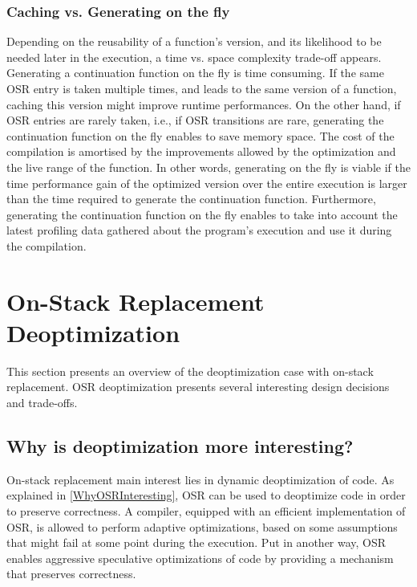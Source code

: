 \subsubsection{Caching vs. Generating on the fly}

Depending on the reusability of a function's version, and its likelihood to be needed later in the execution, a time vs. space complexity trade-off appears.
Generating a continuation function on the fly is time consuming.
If the same OSR entry is taken multiple times, and leads to the same version of a function, caching this version might improve runtime performances.
On the other hand, if OSR entries are rarely taken, i.e., if OSR transitions are rare, generating the continuation function on the fly enables to save memory space. 
The cost of the compilation is amortised by the improvements allowed by the optimization and the live range of the function. 
In other words, generating on the fly is viable if the time performance gain of the optimized version over the entire execution is larger than the time required to generate the continuation function.
Furthermore, generating the continuation function on the fly enables to take into account the latest profiling data gathered about the program's execution and use it during the compilation.\\


\section{On-Stack Replacement Deoptimization}
This section presents an overview of the deoptimization case with on-stack replacement.
OSR deoptimization presents several interesting design decisions and trade-offs.

\subsection{Why is deoptimization more interesting?}\label{WhyDeopt}
On-stack replacement main interest lies in dynamic deoptimization of code.
As explained in \ref{WhyOSRInteresting}, OSR can be used to deoptimize code in order to preserve correctness.
A compiler, equipped with an efficient implementation of OSR, is allowed to perform adaptive optimizations, based on some assumptions that might fail at some point during the execution.
Put in another way, OSR enables aggressive speculative optimizations of code by providing a mechanism that preserves correctness.\\

